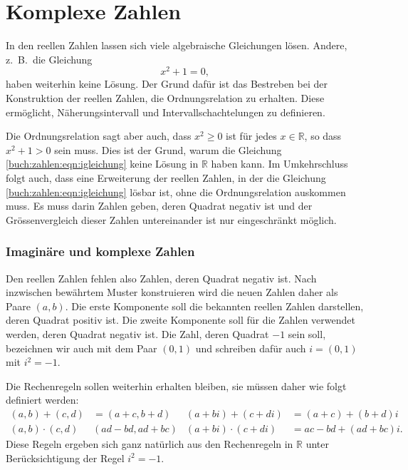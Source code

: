 %
%
%
\section{Komplexe Zahlen
\label{buch:section:komplexe-zahlen}}
In den reellen Zahlen lassen sich viele algebraische Gleichungen lösen.
Andere, z.~B.~die Gleichung
\begin{equation}
x^2+1=0,
\label{buch:zahlen:eqn:igleichung}
\end{equation}
haben weiterhin keine Lösung.
Der Grund dafür ist das Bestreben bei der Konstruktion der reellen Zahlen, 
die Ordnungsrelation zu erhalten.
Diese ermöglicht, Näherungsintervall und Intervallschachtelungen
zu definieren.

Die Ordnungsrelation sagt aber auch, dass $x^2\ge 0$ ist für jedes
$x\in\mathbb{R}$, so dass $x^2+1>0$ sein muss.
Dies ist der Grund, warum die Gleichung \ref{buch:zahlen:eqn:igleichung}
keine Lösung in $\mathbb{R}$ haben kann.
Im Umkehrschluss folgt auch, dass eine Erweiterung der reellen Zahlen,
in der die Gleichung \eqref{buch:zahlen:eqn:igleichung} lösbar ist,
ohne die Ordnungsrelation auskommen muss.
Es muss darin Zahlen geben, deren Quadrat negativ ist und der
Grössenvergleich dieser Zahlen untereinander ist nur eingeschränkt
möglich.

\subsubsection{Imaginäre und komplexe Zahlen}
Den reellen Zahlen fehlen also Zahlen, deren Quadrat negativ ist.
Nach inzwischen bewährtem Muster konstruieren wird die neuen Zahlen
daher als Paare $(a,b)$.
Die erste Komponente soll die bekannten reellen Zahlen darstellen,
deren Quadrat positiv ist.
Die zweite Komponente soll für die Zahlen verwendet werden, deren Quadrat
negativ ist.
Die Zahl, deren Quadrat $-1$ sein soll, bezeichnen wir auch mit dem
Paar $(0,1)$ und schreiben dafür auch $i=(0,1)$ mit $i^2=-1$.

Die Rechenregeln sollen weiterhin erhalten bleiben, sie müssen daher
wie folgt definiert werden:
\begin{equation}
\begin{aligned}
(a,b) + (c,d) &= (a+c,b+d) & (a+bi) + (c+di) &= (a+c) + (b+d)i
\\
(a,b) \cdot (c,d) & (ad-bd, ad+bc) & (a+bi)\cdot(c+di) &= ac-bd + (ad+bc)i.
\end{aligned}
\label{buch:zahlen:cregeln}
\end{equation}
Diese Regeln ergeben sich ganz natürlich aus den Rechenregeln
in $\mathbb{R}$ unter Berücksichtigung der Regel $i^2=-1$.

